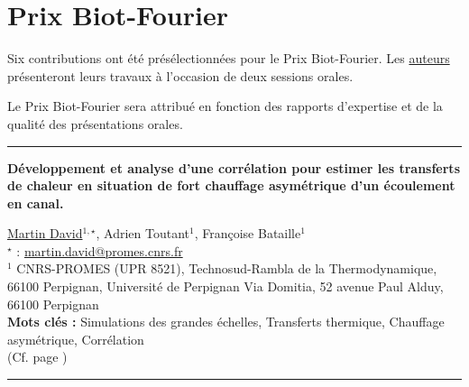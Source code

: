 \chapter{Prix Biot-Fourier}


Six contributions ont été présélectionnées pour le Prix Biot-Fourier. Les \underline{auteurs} présenteront leurs travaux à l’occasion de deux sessions orales.

Le Prix Biot-Fourier sera attribué en fonction des rapports d’expertise et de la qualité des présentations orales.



\hrule
\begin{flushleft}
\addtocounter{section}{1}
{\Large \textbf{Développement et analyse d'une corrélation pour estimer les transferts de chaleur en situation de fort chauffage asymétrique d'un écoulement en canal.}}\label{ref:8}
\end{flushleft}
%
\underline{Martin David}$^{1,\star}$, Adrien Toutant$^{1}$, Françoise Bataille$^{1}$\\[2mm]
$^{\star}$ \Letter : \url{martin.david@promes.cnrs.fr}\\[2mm]
{\footnotesize $^{1}$ CNRS-PROMES (UPR 8521), Technosud-Rambla de la Thermodynamique, 66100 Perpignan, Université de Perpignan Via Domitia, 52 avenue Paul Alduy, 66100 Perpignan}\\
[4mm]
%
\noindent \textbf{Mots clés : } Simulations des grandes échelles, Transferts thermique, Chauffage asymétrique, Corrélation\\[4mm]


\noindent(Cf. page  \pageref{ref:8})
\hrule

